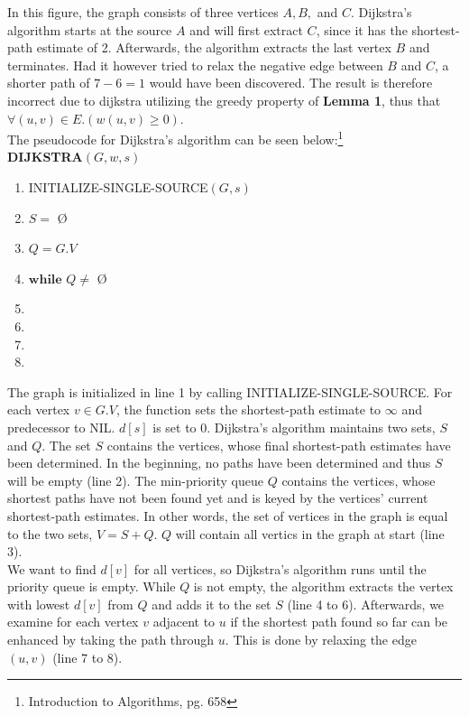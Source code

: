 \documentclass[11pt]{article}
\begin{document}
\noindent In this figure, the graph consists of three vertices $A, B,$ and $C$. Dijkstra's algorithm starts at the source $A$ and will first extract $C$, since it has the shortest-path estimate of 2. Afterwards, the algorithm extracts the last vertex $B$ and terminates. Had it however tried to relax the negative edge between $B$ and $C$, a shorter path of $7 - 6 = 1$ would have been discovered. The result is therefore incorrect due to dijkstra utilizing the greedy property of \textbf{Lemma 1}, thus that $\forall (u,v) \in E.(w(u,v) \geq 0)$. \\

\noindent The pseudocode for Dijkstra's algorithm can be seen below:\footnote{Introduction to Algorithms, pg. 658}\\

\textbf{DIJKSTRA$(G, w, s)$}
\begin{enumerate}
\setlength\itemsep{0em}
\item INITIALIZE-SINGLE-SOURCE$(G, s)$
\item $S = $ \O
\item $Q = G.V$
\item $\textbf{while } Q \neq$ \O
\item {}
\item {}
\item {}
\item \tab{}
\end{enumerate}

\noindent The graph is initialized in line 1 by calling INITIALIZE-SINGLE-SOURCE. For each vertex $v \in G.V$, the function sets the shortest-path estimate to $\infty$ and predecessor to NIL. $d[s]$ is set to 0. Dijkstra's algorithm maintains two sets, $S$ and $Q$. The set $S$ contains the vertices, whose final shortest-path estimates have been determined. In the beginning, no paths have been determined and thus $S$ will be empty (line 2). The min-priority queue $Q$ contains the vertices, whose shortest paths have not been found yet and is keyed by the vertices' current shortest-path estimates. In other words, the set of vertices in the graph is equal to the two sets, $V = S + Q$. $Q$ will contain all vertics in the graph at start (line 3).\\

\noindent We want to find $d[v]$ for all vertices, so Dijkstra's algorithm runs until the priority queue is empty. While $Q$ is not empty, the algorithm extracts the vertex with lowest $d[v]$ from $Q$ and adds it to the set $S$ (line 4 to 6). Afterwards, we examine for each vertex $v$ adjacent to $u$ if the shortest path found so far can be enhanced by taking the path through $u$. This is done by relaxing the edge $(u,v)$ (line 7 to 8).\\
\end{document}
